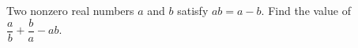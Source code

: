 Two nonzero real numbers $a$ and $b$ satisfy $ab=a-b$. Find the value of $\dfrac{a}{b}+\dfrac{b}{a}-ab$.
